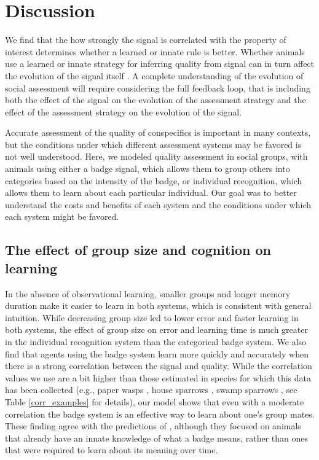 \section*{Discussion}
We find that the how strongly the signal is correlated with the property of interest determines whether a learned or innate rule is better. Whether animals use a learned or innate strategy for inferring quality from signal can in turn affect the evolution of the signal itself \citep{Kamo:2002vi}. A complete understanding of the evolution of social assessment will require considering the full feedback loop, that is including both the effect of the signal on the evolution of the assessment strategy and the effect of the assessment strategy on the evolution of the signal.


Accurate assessment of the quality of conspecifics is important in many contexts, but the conditions under which different assessment systems may be favored is not well understood. Here, we modeled quality assessment in social groups, with animals using either a badge signal, which allows them to group others into categories based on the intensity of the badge, or individual recognition, which allows them to learn about each particular individual. Our goal was to better understand the costs and benefits of each system and the conditions under which each system might be favored. 

\subsection*{The effect of group size and cognition on learning} 

In the absence of observational learning, smaller groups and longer memory duration make it easier to learn in both systems, which is consistent with general intuition. While decreasing group size led to lower error and faster learning in both systems, the effect of group size on error and learning time is much greater in the individual recognition system than the categorical badge system. We also find that agents using the badge system learn more quickly and accurately when there is a strong correlation between the signal and quality. While the correlation values we use are a bit higher than those estimated in species for which this data has been collected (e.g., paper wasps \citep{Tibbetts:2004kx}, house sparrows \citep{Veiga:1993fk}, swamp sparrows \citep{Olsen:2010uq}, see Table \ref{corr_examples} for details), our model shows that even with a moderate correlation the badge system is an effective way to learn about one's group mates. These finding agree with the predictions of \citet{sheehan2016evotradeoff}, although they focused on animals that already have an innate knowledge of what a badge means, rather than ones that were required to learn about its meaning over time.


